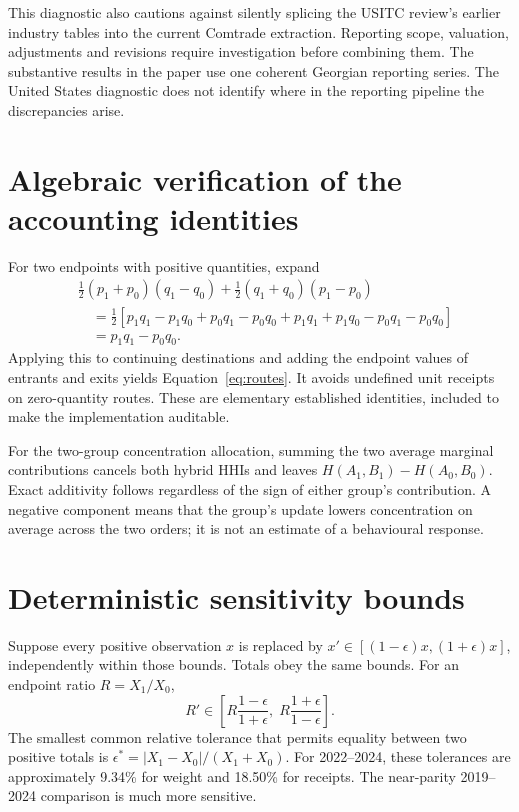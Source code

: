 \documentclass[11pt,a4paper]{article}
\begin{document}
This diagnostic also cautions against silently splicing the USITC review's earlier industry tables into the current Comtrade extraction. Reporting scope, valuation, adjustments and revisions require investigation before combining them. The substantive results in the paper use one coherent Georgian reporting series. The United States diagnostic does not identify where in the reporting pipeline the discrepancies arise.

\section{Algebraic verification of the accounting identities}\label{app:proof}
For two endpoints with positive quantities, expand
\begin{align*}
 &\tfrac12(p_1+p_0)(q_1-q_0)+\tfrac12(q_1+q_0)(p_1-p_0)\\
 &\quad=\tfrac12[p_1q_1-p_1q_0+p_0q_1-p_0q_0
 +p_1q_1+p_1q_0-p_0q_1-p_0q_0]\\
 &\quad=p_1q_1-p_0q_0.
\end{align*}
Applying this to continuing destinations and adding the endpoint values of entrants and exits yields Equation~\ref{eq:routes}. It avoids undefined unit receipts on zero-quantity routes. These are elementary established identities, included to make the implementation auditable.

For the two-group concentration allocation, summing the two average marginal contributions cancels both hybrid HHIs and leaves $H(A_1,B_1)-H(A_0,B_0)$. Exact additivity follows regardless of the sign of either group's contribution. A negative component means that the group's update lowers concentration on average across the two orders; it is not an estimate of a behavioural response.

\section{Deterministic sensitivity bounds}\label{app:sensitivity}
Suppose every positive observation $x$ is replaced by $x'\in[(1-\epsilon)x,(1+\epsilon)x]$, independently within those bounds. Totals obey the same bounds. For an endpoint ratio $R=X_1/X_0$,
\begin{equation}
 R'\in\left[R\frac{1-\epsilon}{1+\epsilon},\;R\frac{1+\epsilon}{1-\epsilon}\right].
\end{equation}
The smallest common relative tolerance that permits equality between two positive totals is $\epsilon^*=|X_1-X_0|/(X_1+X_0)$. For 2022--2024, these tolerances are approximately 9.34\% for weight and 18.50\% for receipts. The near-parity 2019--2024 comparison is much more sensitive.
\end{document}
